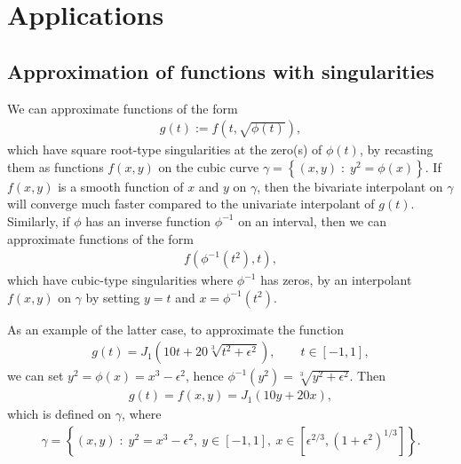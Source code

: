 \documentclass{amsart}
\theoremstyle{remark}
\begin{document}
\section{Applications}

\subsection{Approximation of functions with singularities}

We can approximate functions of the form 
\begin{align}
g(t) := f\left(t,\sqrt{\phi(t)}\right),  \label{eq:singforward}
\end{align}
which have square root-type singularities at the zero(s) of $\phi(t)$, by recasting them as functions $f(x,y)$ on the cubic curve $\gamma = \left\lbrace (x,y) \; : \; y^2 = \phi(x) \right\rbrace$. If $f(x,y)$ is a smooth function of $x$ and $y$ on $\gamma$, then the bivariate interpolant on $\gamma$ will converge much faster compared to the univariate interpolant of $g(t)$. Similarly, if $\phi$ has an inverse function $\phi^{-1}$ on an interval, then we can approximate functions of the form
\begin{align}
f\left(\phi^{-1}(t^2),t\right),  \label{eq:singinverse}
\end{align}
which have cubic-type singularities where $\phi^{-1}$ has zeros, by an interpolant $f(x,y)$ on $\gamma$ by setting $y = t$ and $x = \phi^{-1}(t^2)$. 

As an example of the latter case, to approximate the function
\begin{align}
g(t) =  J_1(10t + 20\sqrt[3]{t^2 + \epsilon^2}), \qquad t \in [-1, 1], \label{eq:funapproxex1}
\end{align}
we can set  $y^2 = \phi(x) = x^3 - \epsilon^2$, hence $\phi^{-1}(y^2) = \sqrt[3]{y^2 + \epsilon^2}$. Then
\begin{align*}
g(t) = f(x,y) = J_1(10y + 20x),
\end{align*} 
which is defined on $\gamma$, where
\begin{align}
\gamma = \left\lbrace (x,y) \; : \; y^2 = x^3 - \epsilon^2, \: y \in [-1, 1], \: x \in [\epsilon^{2/3}, (1 + \epsilon^2)^{1/3}] \right\rbrace.  \label{eq:cubiccurveex1}
\end{align}
\end{document}
